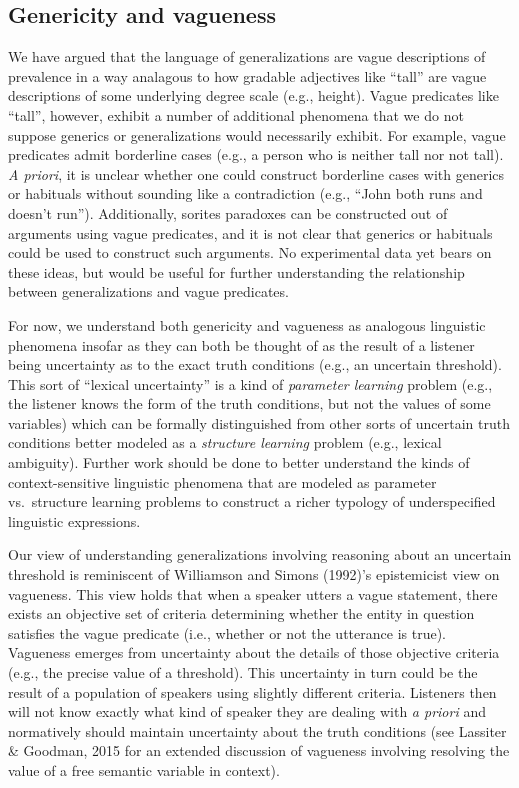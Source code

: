 \documentclass[english,,man,floatsintext]{apa6}
\theoremstyle{definition}
\theoremstyle{definition}
\theoremstyle{definition}
\theoremstyle{remark}
\begin{document}
\hypertarget{genericity-and-vagueness}{%
\subsection{Genericity and vagueness}\label{genericity-and-vagueness}}

We have argued that the language of generalizations are vague
descriptions of prevalence in a way analagous to how gradable adjectives
like \enquote{tall} are vague descriptions of some underlying degree
scale (e.g., height). Vague predicates like \enquote{tall}, however,
exhibit a number of additional phenomena that we do not suppose generics
or generalizations would necessarily exhibit. For example, vague
predicates admit borderline cases (e.g., a person who is neither tall
nor not tall). \emph{A priori}, it is unclear whether one could
construct borderline cases with generics or habituals without sounding
like a contradiction (e.g., \enquote{John both runs and doesn't run}).
Additionally, sorites paradoxes can be constructed out of arguments
using vague predicates, and it is not clear that generics or habituals
could be used to construct such arguments. No experimental data yet
bears on these ideas, but would be useful for further understanding the
relationship between generalizations and vague predicates.

For now, we understand both genericity and vagueness as analogous
linguistic phenomena insofar as they can both be thought of as the
result of a listener being uncertainty as to the exact truth conditions
(e.g., an uncertain threshold). This sort of \enquote{lexical
uncertainty} is a kind of \emph{parameter learning} problem (e.g., the
listener knows the form of the truth conditions, but not the values of
some variables) which can be formally distinguished from other sorts of
uncertain truth conditions better modeled as a \emph{structure learning}
problem (e.g., lexical ambiguity). Further work should be done to better
understand the kinds of context-sensitive linguistic phenomena that are
modeled as parameter vs.~structure learning problems to construct a
richer typology of underspecified linguistic expressions.

Our view of understanding generalizations involving reasoning about an
uncertain threshold is reminiscent of Williamson and Simons (1992)'s
epistemicist view on vagueness. This view holds that when a speaker
utters a vague statement, there exists an objective set of criteria
determining whether the entity in question satisfies the vague predicate
(i.e., whether or not the utterance is true). Vagueness emerges from
uncertainty about the details of those objective criteria (e.g., the
precise value of a threshold). This uncertainty in turn could be the
result of a population of speakers using slightly different criteria.
Listeners then will not know exactly what kind of speaker they are
dealing with \emph{a priori} and normatively should maintain uncertainty
about the truth conditions (see Lassiter \& Goodman, 2015 for an
extended discussion of vagueness involving resolving the value of a free
semantic variable in context).
\end{document}
